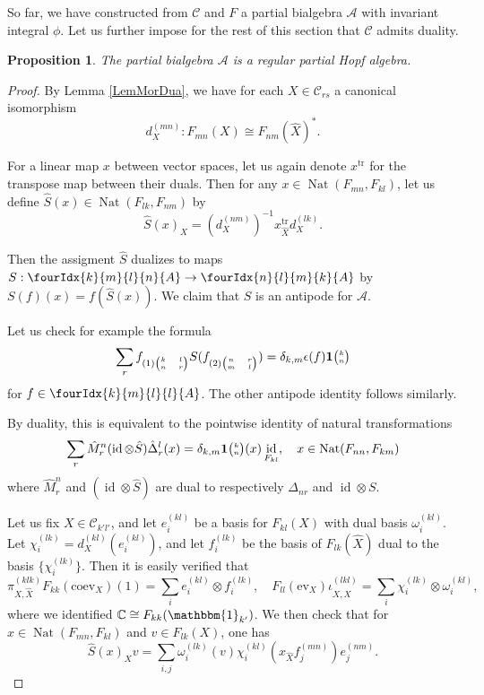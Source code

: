\documentclass[11pt]{article}
\DeclareMathOperator{\id}{id}
\DeclareMathOperator{\Nat}{\mathrm{Nat}}
\DeclareMathOperator{\tr}{\mathrm{tr}}
\newcommand{\n}{\mathfrak{n}}
\newcommand{\C}{\mathbb{C}}
\newcommand{\CatC}{\mathcal{C}}
\newcommand{\CatCC}{\mathscr{C}}
\newcommand{\ev}{\mathrm{ev}}
\newcommand{\coev}{\mathrm{coev}}
\newcommand{\Grt}[3]{#1{\tiny {\begin{pmatrix} #2\\#3\end{pmatrix}}}}
\newcommand{\Unitb}{\mathbbm{1}}
\newcommand{\UnitC}[2]{\Grt{\mathbf{1}}{#1}{#2}}
\newcommand{\Gr}[5]{\fourIdx{#2}{#4}{#3}{#5}{#1}}%
\newtheorem{Prop}[Theorem]{Proposition}
\theoremstyle{definition}
\numberwithin{equation}{section}
\begin{document}
So far, we have constructed from $\CatCC$ and $F$ a partial bialgebra $\mathscr{A}$ with invariant integral $\phi$. Let us further impose for the rest of this section that $\CatCC$ admits duality.

\begin{Prop}\label{PropAnti} The partial bialgebra $\mathscr{A}$ is a regular partial Hopf algebra.
\end{Prop} 

\begin{proof} By Lemma \ref{LemMorDua}, we have for each $X\in \CatC_{rs}$ a canonical isomorphism \[d^{(mn)}_X:F_{mn}(X) \cong F_{nm}(\hat{X})^*.\] 

For a linear map $x$ between vector spaces, let us again denote $x^{\tr}$ for the transpose map between their duals. Then for any $x\in \Nat(F_{mn},F_{kl})$, let us define $\hat{S}(x) \in \Nat(F_{lk},F_{nm})$ by \[\hat{S}(x)_X = \left(d^{(nm)}_X\right)^{-1} x_{\hat{X}}^{\tr} d_X^{(lk)}.\] 

Then the assigment $\hat{S}$ dualizes to maps $S:\Gr{A}{k}{l}{m}{n} \rightarrow \Gr{A}{n}{m}{l}{k}$ by $S(f)(x) = f(\hat{S}(x))$. We claim that $S$ is an antipode for $\mathscr{A}$. 

Let us check for example the formula \[\sum_r f_{(1){\tiny \begin{pmatrix}k&l\\n & r\end{pmatrix}}} S(f_{(2){\tiny \begin{pmatrix} n & r \\ m & l\end{pmatrix}}}) = \delta_{k,m}\epsilon(f)\UnitC{k}{n}\] for $f\in \Gr{A}{k}{l}{m}{l}$. The other antipode identity follows similarly.

By duality, this is equivalent to the pointwise identity of natural transformations \[\sum_r\hat{M}^n_r(\id\otimes \hat{S})\hat{\Delta}^l_r(x) = \delta_{k,m}\UnitC{k}{n}(x) \id_{F_{kl}},\quad x\in \Nat(F_{nn},F_{km})\] where $\hat{M}^n_r$ and $(\id\otimes \hat{S})$ are dual to respectively $\Delta_{nr}$ and $\id\otimes S$. 

Let us fix $X\in \mathcal{C}_{k'l'}$, and let $e_i^{(kl)}$ be a basis for $F_{kl}(X)$ with dual basis $\omega_i^{(kl)}$. Let $\chi_i^{(lk)} = d_X^{(kl)}(e_i^{(kl)})$, and let $f_i^{(lk)}$ be the basis of $F_{lk}(\hat{X})$ dual to the basis $\{\chi_i^{(lk)}\}$. Then it is easily verified that \[\pi^{(klk)}_{X,\hat{X}}F_{kk}(\coev_{X})(1) = \sum_i e_i^{(kl)}\otimes f_i^{(lk)},\quad F_{ll}(\ev_X)\iota^{(lkl)}_{\hat{X},X} = \sum_i \chi_i^{(lk)}\otimes \omega_i^{(kl)},\] where we identified $\C\cong F_{kk}(\Unitb_{k'})$. We then check that for $x\in \Nat(F_{mn},F_{kl})$ and $v\in F_{lk}(X)$, one has \[\hat{S}(x)_Xv = \sum_{i,j} \omega_i^{(lk)}(v)\chi_i^{(kl)}(x_{\hat{X}}f_j^{(mn)})e_j^{(nm)}.\] 



\end{proof}
\end{document}
